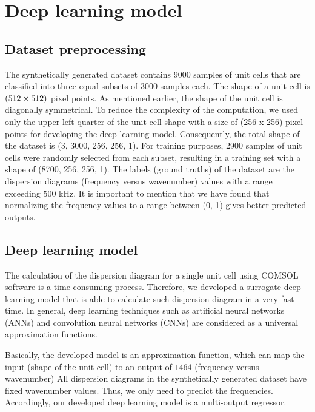 \section{Deep learning model}
\subsection{Dataset preprocessing}
\noindent 

The synthetically generated dataset contains 9000 samples of unit cells that are classified into three equal subsets of 3000 samples each.
The shape of a unit cell is \((\textup{512}\times \textup{512})\) pixel points.
As mentioned earlier, the shape of the unit cell is diagonally symmetrical.
To reduce the complexity of the computation, we used only the upper left quarter of the unit cell shape with a size of (256 x 256) pixel points for developing the deep learning model.
Consequently, the total shape of the dataset is (3, 3000, 256, 256, 1).
For training purposes, 2900 samples of unit cells were randomly selected from each subset, resulting in a training set with a shape of (8700, 256, 256, 1).
The labels (ground truths) of the dataset are the dispersion diagrams (frequency versus wavenumber) values with a range exceeding \(500\) kHz.
It is important to mention that we have found that normalizing the frequency values to a range between (0, 1) gives better predicted outputs.


\subsection{Deep learning model}
\noindent
The calculation of the dispersion diagram for a single unit cell using COMSOL software is a time-consuming process.		
Therefore, we developed a surrogate deep learning model that is able to calculate such dispersion diagram in a very fast time.
In general, deep learning techniques such as artificial neural networks (ANNs) and convolution neural networks (CNNs) are considered as a universal approximation functions.

Basically, the developed model is an approximation function, which can map the input (shape of the unit cell) to an output of \(1464\) (frequency versus wavenumber) 
All dispersion diagrams in the synthetically generated dataset have fixed wavenumber values.
Thus, we only need to predict the frequencies.		
Accordingly, our developed deep learning model is a multi-output regressor.	

